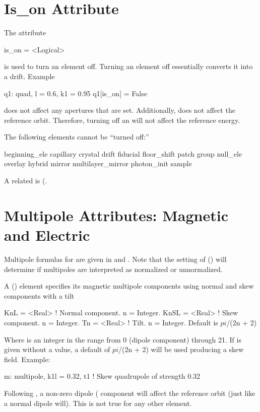 \section{Is_on Attribute}
\label{s:is.on}

The  attribute
\begin{example}
  is_on = <Logical>
\end{example}
is used to turn an element off. Turning
an element off essentially converts it into a drift.
Example
\begin{example}
  q1: quad, l = 0.6, k1 = 0.95
  q1[is_on] = False
\end{example}

 does not affect any apertures that are set. Additionally,  does not affect the
reference orbit. Therefore, turning off an  will not affect the reference energy.

The following elements cannot be ``turned off:''
\begin{example}
  beginning_ele
  capillary
  crystal
  drift
  fiducial
  floor_shift
  patch
  group
  null_ele
  overlay
  hybrid
  mirror
  multilayer_mirror
  photon_init
  sample
\end{example}

A related is  (.

\section{Multipole Attributes: Magnetic and Electric}
\label{s:multip}

Multipole formulas for are given in  and . Note that the
setting of  () will determine if multipoles are interpreted as
normalized or unnormalized.

A  () element specifies its magnetic multipole components using normal
and skew components with a tilt
\begin{example}
  KnL  = <Real>  ! Normal component. n = Integer. 
  KnSL = <Real>  ! Skew component. n = Integer. 
  Tn   = <Real>  ! Tilt. n = Integer. Default is $pi$/(2n + 2)
\end{example}
Where  is an integer in the range from 0 (dipole component) through 21.  If  is given
without a value, a default of $pi$/(2n + 2) will be used producing a skew field. Example:
\begin{example}
  m: multipole, k1l = 0.32, t1  ! Skew quadrupole of strength 0.32
\end{example}
Following , a non-zero dipole ( component will affect the reference orbit (just like
a normal dipole will). This is not true for any other element.

